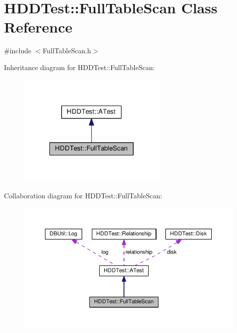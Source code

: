 \hypertarget{class_h_d_d_test_1_1_full_table_scan}{\section{H\-D\-D\-Test\-:\-:Full\-Table\-Scan Class Reference}
\label{class_h_d_d_test_1_1_full_table_scan}
}


{\ttfamily \#include $<$Full\-Table\-Scan.\-h$>$}



Inheritance diagram for H\-D\-D\-Test\-:\-:Full\-Table\-Scan\-:\nopagebreak
\begin{figure}[H]
\begin{center}
\leavevmode
\includegraphics[width=206pt]{class_h_d_d_test_1_1_full_table_scan__inherit__graph}
\end{center}
\end{figure}


Collaboration diagram for H\-D\-D\-Test\-:\-:Full\-Table\-Scan\-:\nopagebreak
\begin{figure}[H]
\begin{center}
\leavevmode
\includegraphics[width=350pt]{class_h_d_d_test_1_1_full_table_scan__coll__graph}
\end{center}
\end{figure}
